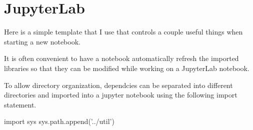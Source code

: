 \documentclass[]{book}
\newenvironment{Shaded}{\begin{snugshade}}{\end{snugshade}}
\newcommand{\DecValTok}[1]{\textcolor[rgb]{0.00,0.00,0.81}{#1}}
\newcommand{\StringTok}[1]{\textcolor[rgb]{0.31,0.60,0.02}{#1}}
\newcommand{\ImportTok}[1]{#1}
\newcommand{\OperatorTok}[1]{\textcolor[rgb]{0.81,0.36,0.00}{\textbf{#1}}}
\newcommand{\NormalTok}[1]{#1}
\begin{document}
\chapter{JupyterLab}\label{jupyter}

Here is a simple template that I use that controls a couple useful
things when starting a new notebook.

\begin{Shaded}
\end{Shaded}

It is often convenient to have a notebook automatically refresh the
imported libraries so that they can be modified while working on a
JupyterLab notebook.

\begin{Shaded}
\begin{Highlighting}[]
\OperatorTok{%}\NormalTok{reload_ext autoreload}
\OperatorTok{%}\NormalTok{autoreload }\DecValTok{2}
\end{Highlighting}
\end{Shaded}

To allow directory organization, dependcies can be separated into
different directories and imported into a jupyter notebook using the
following import statement.

\begin{Shaded}
\begin{Highlighting}[]
\ImportTok{import}\NormalTok{ sys}
\NormalTok{sys.path.append(}\StringTok{'../util'}\NormalTok{)}
\end{Highlighting}
\end{Shaded}
\end{document}

